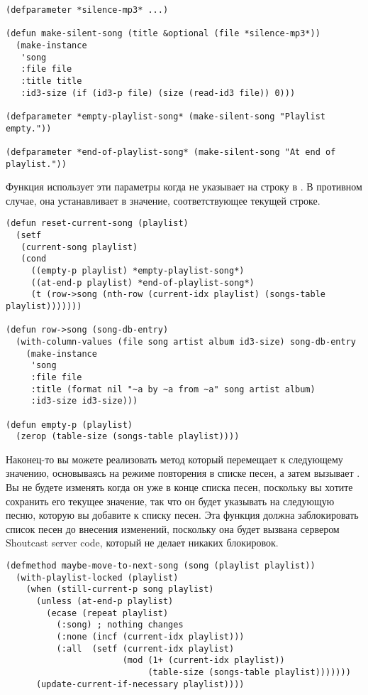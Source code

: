 \begin{lstlisting}
(defparameter *silence-mp3* ...)

(defun make-silent-song (title &optional (file *silence-mp3*))
  (make-instance
   'song 
   :file file
   :title title
   :id3-size (if (id3-p file) (size (read-id3 file)) 0)))

(defparameter *empty-playlist-song* (make-silent-song "Playlist empty."))

(defparameter *end-of-playlist-song* (make-silent-song "At end of playlist."))
\end{lstlisting}

Функция  использует эти параметры когда  не
указывает на строку в .  В противном случае, она устанавливает
 в значение, соответствующее текущей строке.

\begin{lstlisting}
(defun reset-current-song (playlist)
  (setf
   (current-song playlist) 
   (cond
     ((empty-p playlist) *empty-playlist-song*)
     ((at-end-p playlist) *end-of-playlist-song*)
     (t (row->song (nth-row (current-idx playlist) (songs-table playlist)))))))

(defun row->song (song-db-entry)
  (with-column-values (file song artist album id3-size) song-db-entry
    (make-instance
     'song
     :file file
     :title (format nil "~a by ~a from ~a" song artist album)
     :id3-size id3-size)))

(defun empty-p (playlist)
  (zerop (table-size (songs-table playlist))))
\end{lstlisting}

Наконец-то вы можете реализовать метод  который перемещает
 к следующему значению, основываясь на режиме повторения в списке песен,
а затем вызывает .  Вы не будете изменять
 когда он уже в конце списка песен, поскольку вы хотите сохранить его
текущее значение, так что он будет указывать на следующую песню, которую вы добавите к
списку песен.  Эта функция должна заблокировать список песен до внесения изменений,
поскольку она будет вызвана сервером Shoutcast server code, который не делает никаких
блокировок.

\begin{lstlisting}
(defmethod maybe-move-to-next-song (song (playlist playlist))
  (with-playlist-locked (playlist)
    (when (still-current-p song playlist)
      (unless (at-end-p playlist)
        (ecase (repeat playlist)
          (:song) ; nothing changes
          (:none (incf (current-idx playlist)))
          (:all  (setf (current-idx playlist)
                       (mod (1+ (current-idx playlist))
                            (table-size (songs-table playlist)))))))
      (update-current-if-necessary playlist))))
\end{lstlisting}

